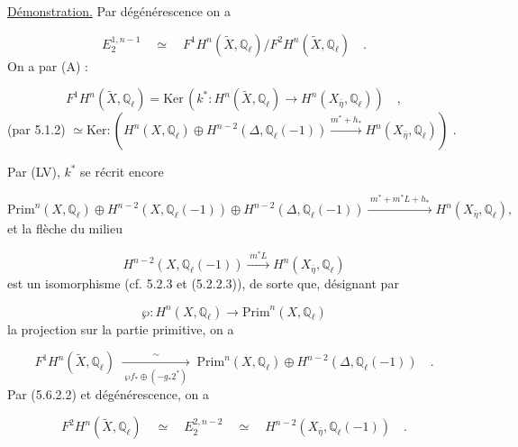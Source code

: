 \underline{Démonstration.} Par dégénérescence on a

\begin{equation*}
E_2^{1,n-1} \quad \simeq \quad F^1 H^n(\tilde{X},\mathbb{Q}_\ell) \Big/ F^2 H^n(\tilde{X},\mathbb{Q}_\ell) \quad .
\end{equation*}
On a par (A) :

\begin{equation}\tag{5.7.2}
F^1 H^n(\tilde{X},\mathbb{Q}_\ell) = \mathrm{Ker}\,(k^* : H^n(\tilde{X},\mathbb{Q}_\ell) \longrightarrow H^n(X_{\bar{\eta}},\mathbb{Q}_\ell)) \quad ,
\end{equation}
(par 5.1.2) $\simeq \mathrm{Ker}: (H^n(X,\mathbb{Q}_\ell) \oplus H^{n-2}(\Delta,\mathbb{Q}_\ell(-1)) \xrightarrow{m^*+h_*} H^n(X_{\bar{\eta}},\mathbb{Q}_\ell))$ .

Par (LV), $k^*$ se récrit encore

\begin{equation}\tag{5.7.3}
\mathrm{Prim}^n(X,\mathbb{Q}_\ell) \oplus H^{n-2}(X,\mathbb{Q}_\ell(-1)) \oplus H^{n-2}(\Delta,\mathbb{Q}_\ell(-1)) \xrightarrow{\;m^*+m^*L+h_*\;} H^n(X_{\bar{\eta}},\mathbb{Q}_\ell),
\end{equation}
et la flèche du milieu

\begin{equation}\tag{5.7.4}
H^{n-2}(X,\mathbb{Q}_\ell(-1)) \xrightarrow{\;m^*L\;} H^n(X_{\bar{\eta}},\mathbb{Q}_\ell)
\end{equation}
est un isomorphisme (cf. 5.2.3 et (5.2.2.3)), de sorte que, désignant par

\begin{equation}\tag{5.7.5}
\wp : H^n(X,\mathbb{Q}_\ell) \longrightarrow \mathrm{Prim}^n(X,\mathbb{Q}_\ell)
\end{equation}
la projection sur la partie primitive, on a

\begin{equation}\tag{5.7.6}
F^1 H^n(\tilde{X},\mathbb{Q}_\ell) \;\xrightarrow[\;\wp f_*\oplus(-g_*2^*)\;]{\sim}\; \mathrm{Prim}^n(X,\mathbb{Q}_\ell) \oplus H^{n-2}(\Delta,\mathbb{Q}_\ell(-1)) \quad .
\end{equation}
Par (5.6.2.2) et dégénérescence, on a

\begin{equation}\tag{5.7.7}
F^2 H^n(\tilde{X},\mathbb{Q}_\ell) \quad \simeq \quad E_2^{2,n-2} \quad \simeq \quad H^{n-2}(X_{\bar{\eta}},\mathbb{Q}_\ell(-1)) \quad .
\end{equation}


